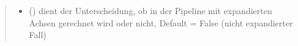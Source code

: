 \documentclass[a4paper,10pt,ngerman]{sphinxmanual}
\begin{document}
\begin{fulllineitems}
\begin{quote}
\begin{description}
\begin{itemize}
\item {} 
\sphinxAtStartPar
{} () \textendash{} dient der Unterscheidung, ob in der Pipeline mit expandierten Achsen gerechnet wird oder nicht, Default = False (nicht expandierter Fall)

\end{itemize}

\sphinxAtStartPar
{}

\end{description}\end{quote}

\end{fulllineitems}

\end{document}
